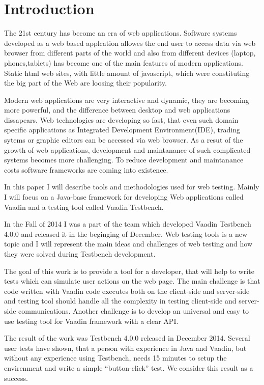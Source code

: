 	
	 \chapter{Introduction}
	 \label{ch:intro} 		
	The 21st century has become an era of web applications. Software systems
	developed as a web based applcation allowes the end user to access data via web browser
	from different parts of the world and also from different devices (laptop,
	phones,tablets) has become one of the main features of modern
	applications. Static html web sites, with little amount of javascript, which
	were constituting the big part of the Web are loosing their popularity.
	
	 Modern web	applications are very interactive and dynamic, they are becoming
	more powerful, and the difference between desktop and web applications
	dissapears. Web technologies are developing so fast, that even such domain
	specific applications as Integrated Development Environment(IDE), trading
	sytems or graphic editors can be accessed via web browser. As a resut of the
	growth of web applications, development and maintanance of such complicated
	systems becomes more challenging. To reduce development and maintanance costs
	software frameworks are coming into existence.
	
	In this paper I will describe tools and methodologies used for web testing. Mainly I will focus on a Java-base
	framework for developing Web applications called Vaadin and a testing tool
	called Vaadin Testbench.
	
	 In the Fall of 2014 I was a part of the team which developed Vaadin Testbench
	 4.0.0 and released it in the beginging of December. Web testing tools is a
	 new topic and I will represent the main ideas and challenges
	 of web testing and how they were solved during Testbench development.
	 
	 The goal of this work is to provide a tool for a developer, that will help to
	 write tests which can simulate user actions on the web page. The main
	 challenge is that code written with Vaadin code executes both on the
	 client-side and server-side and testing tool should handle all the complexity
	 in testing client-side and server-side communications. Another challenge is to
	 develop an universal and easy to use testing tool for Vaadin framework with a
	 clear API.
	 
	  The result of the work was Testbench 4.0.0 released in December 2014.
	  Several user tests have shown, that a person with experience in Java and
	  Vaadin, but without any experience using Testbench, needs 15 minutes to setup
	  the envirenment and write a simple ``button-click'' test. We consider this
	  result as a success.
	  

